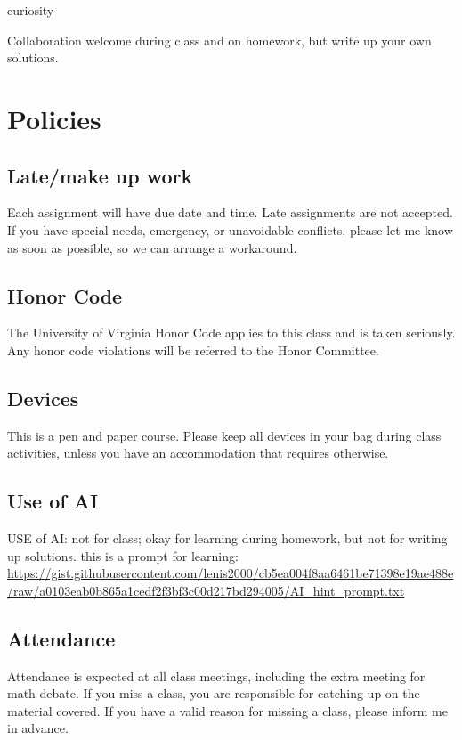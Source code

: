 \documentclass[oneside,11pt]{amsart}
\begin{document}
curiosity

Collaboration welcome during class and on homework, but write up your own solutions.







\section{Policies}

\subsection{Late/make up work}

Each assignment will have due date and time. Late assignments are not accepted. If you have special needs, emergency, or unavoidable conflicts, please let me know as soon as possible, so we can arrange a workaround.

\subsection{Honor Code}
The University of Virginia Honor Code applies to this class and is taken seriously. Any honor code violations will be referred to the Honor Committee. 

\subsection{Devices}

This is a pen and paper course. Please keep all devices in your bag during class activities, unless you have an accommodation that requires otherwise.

\subsection{Use of AI}

USE of AI: not for class; okay for learning during homework, but not for writing up solutions.
this is a prompt for learning: \url{https://gist.githubusercontent.com/lenis2000/cb5ea004f8aa6461be71398e19ae488e/raw/a0103eab0b865a1cedf2f3bf3c00d217bd294005/AI_hint_prompt.txt}


\subsection{Attendance}

Attendance is expected at all class meetings, including the extra meeting for math debate. If you miss a class, you are responsible for catching up on the material covered. If you have a valid reason for missing a class, please inform me in advance.
\end{document}
